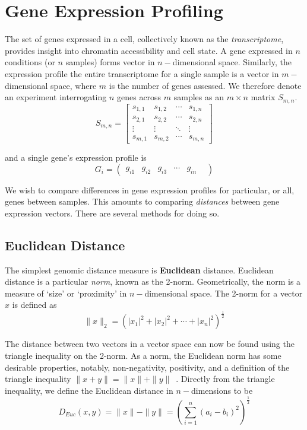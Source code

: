 

\section*{Gene Expression Profiling}

The set of genes expressed in a cell, collectively known as the \textit{transcriptome}, provides insight into chromatin accessibility
and cell state.  A gene expressed in $n$ conditions (or $n$ samples) forms vector in $n-$dimensional space.  Similarly, the expression
profile the entire transcriptome for a single sample is a vector in $m-$dimensional space, where $m$ is the number of genes assessed.
We therefore denote an experiment interrogating $n$ genes across $m$ samples as an $m \times n$ matrix $S_{m,n}$.
\[
  S_{m,n} = \left[
    \begin{array}{cccc}
      s_{1,1} & s_{1,2} & \cdots & s_{1,n} \\
      s_{2,1} & s_{2,2} & \cdots & s_{2,n} \\
      \vdots & \vdots & \ddots  & \vdots \\
      s_{m,1} & s_{m,2} & \cdots & s_{m,n}
    \end{array}
  \right]
\]

and a single gene's expression profile is
\[ G_{i} = \begin{pmatrix} g_{i1} & g_{i2} & g_{i3} & \cdots & g_{in} & \end{pmatrix} \]

We wish to compare differences in gene expression profiles for particular, or all, genes between samples.  This amounts to comparing
\textit{distances} between gene expression vectors.  There are several methods for doing so.

\subsection*{Euclidean Distance}

The simplest genomic distance measure is \textbf{Euclidean} distance.  Euclidean distance is a particular \textit{norm}, known as
the 2-norm.  Geometrically, the norm is a measure of `size' or `proximity' in $n-$dimensional space.  The 2-norm for a vector $x$ is
defined as
\[
  \|x\|_{2} = {(|x_1|^2 + |x_2|^2 + \cdots + |x_n|^2)}^{\frac{1}{2}}
\]

The distance between two vectors in a vector space can now be found using the triangle inequality on the 2-norm.  As a norm, the Euclidean
norm has some desirable properties, notably, non-negativity, positivity, and a definition of the triangle inequality
$\|x + y\| = \|x\| + \|y\|$~\cite{horn2013}.  Directly from the triangle inequality, we define the Euclidean distance in $n-$dimensions to
be
\[
  D_{Euc}(x,y) = \|x\| - \|y\| = {(\sum_{i = 1}^{n}{(a_i - b_i)}^2)}^{\frac{1}{2}}
\]


